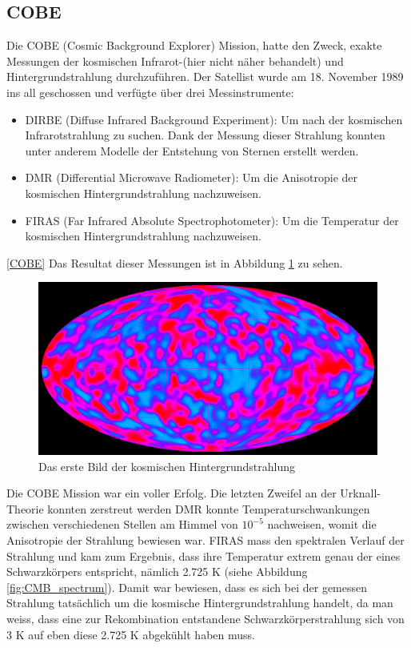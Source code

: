 \subsection{COBE}
Die COBE (Cosmic Background Explorer) Mission, hatte den Zweck, exakte 
Messungen der kosmischen Infrarot-(hier nicht näher behandelt) und 
Hintergrundstrahlung durchzuführen.
Der Satellist wurde am 18. November 1989 ins all geschossen und verfügte über 
drei Messinstrumente:
\begin{itemize}
	\item DIRBE (Diffuse Infrared Background Experiment): Um nach der 
	kosmischen Infrarotstrahlung zu suchen.
	Dank der Messung dieser Strahlung konnten unter anderem Modelle der 
	Entstehung von Sternen erstellt werden.
	\item DMR (Differential Microwave Radiometer): Um die Anisotropie der 
	kosmischen Hintergrundstrahlung nachzuweisen.
	\item FIRAS (Far Infrared Absolute Spectrophotometer): Um die Temperatur 
	der kosmischen Hintergrundstrahlung nachzuweisen. 
\end{itemize}
\ref{COBE}
Das Resultat dieser Messungen ist in Abbildung \ref{fig:COBE} zu sehen.
\begin{figure}
	\includegraphics[width=\linewidth]{cmb/images/COBE_CMB.jpg}
	\caption{Das erste Bild der kosmischen Hintergrundstrahlung}
	\label{fig:COBE}
\end{figure}
Die COBE Mission war ein voller Erfolg.
Die letzten Zweifel an der Urknall-Theorie konnten zerstreut werden
DMR konnte Temperaturschwankungen zwischen verschiedenen Stellen am Himmel 
von $10^{-5}$ nachweisen, womit die Anisotropie der Strahlung bewiesen war.
FIRAS mass den spektralen Verlauf der Strahlung und kam zum Ergebnis, dass ihre 
Temperatur extrem genau der eines Schwarzkörpers entspricht, nämlich 2.725 K 
(siehe Abbildung \ref{fig:CMB_spectrum}).
Damit war bewiesen, dass es sich bei der gemessen Strahlung tatsächlich um die 
kosmische Hintergrundstrahlung handelt, da man weiss, dass eine zur 
Rekombination entstandene Schwarzkörperstrahlung sich von 3 K auf eben diese 
2.725 K abgekühlt haben muss.

